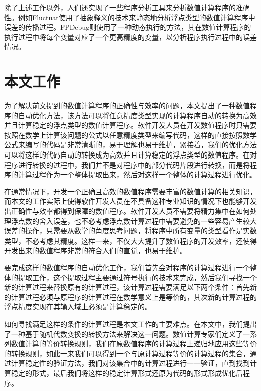 除了上述工作以外，人们还实现了一些程序分析工具来分析数值计算程序的准确性。例如Fluctuat\cite{Goubault:2011:SAF:1946284.1946301}使用了抽象释义的技术来静态地分析浮点类型的数值计算程序中误差的传播过程。FPDebug\cite{Benz:2012:DPA:2345156.2254118}则使用了一种动态执行的方法，其在数值计算程序的执行过程中将每个变量对应了一个更高精度的变量，以分析程序执行过程中的误差情况。

\section{本文工作}

为了解决前文提到的数值计算程序的正确性与效率的问题，本文提出了一种数值程序的自动优化方法，该方法可以将任意精度类型实现的计算程序自动的转换为高效并且计算稳定的浮点类型的数值计算程序。软件开发人员在开发数值程序时只需要按照在数学上计算该问题的公式以任意精度类型来编写代码，这样的直接按照数学公式来编写的代码是非常清晰的，易于理解也易于维护，紧接着，我们的优化方法可以将这样的代码自动的转换成为高效并且计算稳定的浮点类型的数值程序。在对程序进行转换的过程中，我们并不是对程序中的部分代码片段进行转换，而是将程序的计算过程作为一个整体提取出来，然后对这样一个整体的计算过程进行优化。

在通常情况下，开发一个正确且高效的数值程序需要丰富的数值计算的相关知识，而本文的工作实际上使得软件开发人员在不具备这种专业知识的情况下也能够开发出正确性与效率都得到保障的数值程序。软件开发人员不需要将精力集中在如何处理浮点数的舍入误差，也不必考虑浮点数计算过程中需要避免的一些容易产生较大误差的操作，只需要从数学的角度思考问题，将程序中所有变量的类型看作是实数类型，不必考虑其精度。这样一来，不仅大大提升了数值程序的开发效率，还使得开发出来的数值程序非常的符合人们的直觉，也易于维护。

要完成这样的数值程序的自动优化工作，我们首先会对程序的计算过程进行一个整体的提取工作，这个提取过程主要通过符号执行\cite{Cadar:2013:SES:2408776.2408795}的技术来完成，然后我们寻找一个新的计算过程来替换原有的计算过程，该计算过程需要满足以下两个条件：首先新的计算过程必须与原程序的计算过程在数学意义上是等价的，其次新的计算过程的浮点精度实现在其输入域上必须是计算稳定的。

如何寻找满足这样的条件的计算过程是本文工作的主要难点。在本文中，我们提出了一种基于随机代数变换的转换方法来解决这一问题。数值计算专家们定义了一系列数值计算的等价转换规则，我们在原数值程序的计算过程上递归地应用这些等价的转换规则，如此一来我们可以得到一个与原计算过程等价的计算过程的集合，通过计算稳定性的验证方法，我们对该集合中的计算过程进行一一验证，直到找到计算稳定的形式，最后我们将这样的稳定计算形式还原为代码的形式形成优化后程序。

